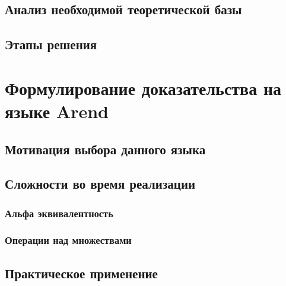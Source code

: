 \documentclass[times,specification,annotation]{itmo-student-thesis}
\begin{document}
\todo
\section{Анализ необходимой теоретической базы}
\todo
\section{Этапы решения}
\todo

\chapterconclusion

\chapter{Формулирование доказательства на языке Arend}
\todo
\section{Мотивация выбора данного языка}
\todo
\section{Сложности во время реализации}
\todo
\subsection{Альфа эквивалентность}
\todo
\subsection{Операции над множествами}
\todo
\section{Практическое применение}
\todo



\end{document}
